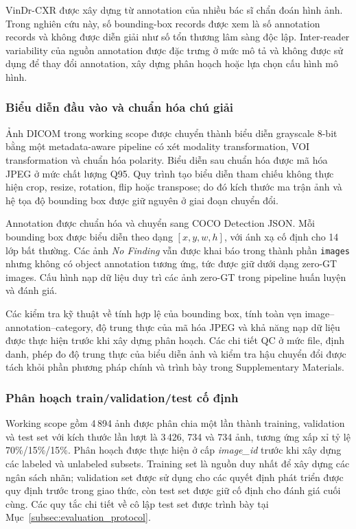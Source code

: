 \documentclass[pdflatex,sn-mathphys-num]{sn-jnl}%
\theoremstyle{thmstyleone}%
\theoremstyle{thmstyletwo}%
\theoremstyle{thmstylethree}%
\begin{document}
VinDr-CXR được xây dựng từ annotation của nhiều bác sĩ chẩn đoán hình ảnh.
Trong nghiên cứu này, số bounding-box records được xem là số annotation
records và không được diễn giải như số tổn thương lâm sàng độc lập.
Inter-reader variability của nguồn annotation được đặc trưng ở mức mô tả
và không được sử dụng để thay đổi annotation, xây dựng phân hoạch hoặc lựa
chọn cấu hình mô hình.

\subsubsection{Biểu diễn đầu vào và chuẩn hóa chú giải}
\label{subsubsec:input_representation}

Ảnh DICOM trong working scope được chuyển thành biểu diễn grayscale 8-bit
bằng một metadata-aware pipeline có xét modality transformation, VOI
transformation và chuẩn hóa polarity. Biểu diễn sau chuẩn hóa được mã hóa
JPEG ở mức chất lượng Q95. Quy trình tạo biểu diễn tham chiếu không thực
hiện crop, resize, rotation, flip hoặc transpose; do đó kích thước ma trận
ảnh và hệ tọa độ bounding box được giữ nguyên ở giai đoạn chuyển đổi.

Annotation được chuẩn hóa và chuyển sang COCO Detection JSON. Mỗi
bounding box được biểu diễn theo dạng \([x,y,w,h]\), với ánh xạ cố định
cho 14 lớp bất thường. Các ảnh \textit{No Finding} vẫn được khai báo trong
thành phần \texttt{images} nhưng không có object annotation tương ứng,
tức được giữ dưới dạng zero-GT images. Cấu hình nạp dữ liệu duy trì các
ảnh zero-GT trong pipeline huấn luyện và đánh giá.

Các kiểm tra kỹ thuật về tính hợp lệ của bounding box, tính toàn vẹn
image--annotation--category, độ trung thực của mã hóa JPEG và khả năng nạp
dữ liệu được thực hiện trước khi xây dựng phân hoạch. Các chi tiết QC ở
mức file, định danh, phép đo độ trung thực của biểu diễn ảnh và kiểm tra
hậu chuyển đổi được tách khỏi phần phương pháp chính và trình bày trong
Supplementary Materials.

\subsubsection{Phân hoạch train/validation/test cố định}
\label{subsec:fixed_data_split}

Working scope gồm 4\,894 ảnh được phân chia một lần thành training,
validation và test set với kích thước lần lượt là 3\,426, 734 và 734 ảnh,
tương ứng xấp xỉ tỷ lệ 70\%/15\%/15\%. Phân hoạch được thực hiện ở cấp
\textit{image\_id} trước khi xây dựng các labeled và unlabeled subsets.
Training set là nguồn duy nhất để xây dựng các ngân sách nhãn; validation
set được sử dụng cho các quyết định phát triển được quy định trước trong
giao thức, còn test set được giữ cố định cho đánh giá cuối cùng. Các quy
tắc chi tiết về cô lập test set được trình bày tại
Mục~\ref{subsec:evaluation_protocol}.
\end{document}
